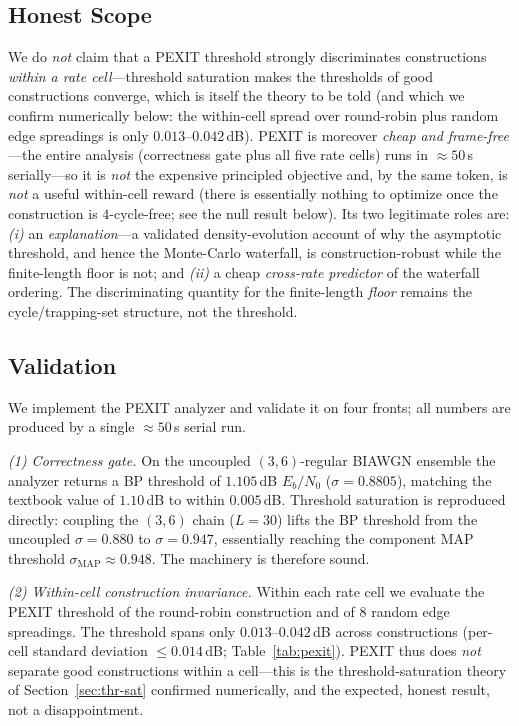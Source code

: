 \documentclass[journal]{IEEEtran}
\begin{document}
\subsection{Honest Scope}
We do \emph{not} claim that a PEXIT threshold strongly discriminates
constructions \emph{within a rate cell}---threshold saturation makes the
thresholds of good constructions converge, which is itself the theory to be
told (and which we confirm numerically below: the within-cell spread over
round-robin plus random edge spreadings is only $0.013$--$0.042$\,dB). PEXIT is
moreover \emph{cheap and frame-free}---the entire analysis (correctness gate
plus all five rate cells) runs in $\approx\!50$\,s serially---so it is
\emph{not} the expensive principled objective and, by the same token, is
\emph{not} a useful within-cell reward (there is essentially nothing to
optimize once the construction is $4$-cycle-free; see the null result below).
Its two legitimate roles are: \emph{(i)} an \emph{explanation}---a validated
density-evolution account of why the asymptotic threshold, and hence the
Monte-Carlo waterfall, is construction-robust while the finite-length floor is
not; and \emph{(ii)} a cheap \emph{cross-rate predictor} of the waterfall
ordering. The discriminating quantity for the finite-length \emph{floor}
remains the cycle/trapping-set structure, not the threshold.

\subsection{Validation}\label{sec:pexit-val}
We implement the PEXIT analyzer and validate it on four fronts; all numbers are
produced by a single $\approx\!50$\,s serial run.

\emph{(1) Correctness gate.} On the uncoupled $(3,6)$-regular BIAWGN ensemble the
analyzer returns a BP threshold of $1.105$\,dB $E_b/N_0$ ($\sigma=0.8805$),
matching the textbook value of $1.10$\,dB to within $0.005$\,dB. Threshold
saturation is reproduced directly: coupling the $(3,6)$ chain ($L{=}30$) lifts
the BP threshold from the uncoupled $\sigma=0.880$ to $\sigma=0.947$, essentially
reaching the component MAP threshold $\sigma_{\mathrm{MAP}}\approx0.948$. The
machinery is therefore sound.

\emph{(2) Within-cell construction invariance.} Within each rate cell we evaluate
the PEXIT threshold of the round-robin construction and of $8$ random edge
spreadings. The threshold spans only $0.013$--$0.042$\,dB across constructions
(per-cell standard deviation $\le0.014$\,dB; Table~\ref{tab:pexit}). PEXIT thus
does \emph{not} separate good constructions within a cell---this is the
threshold-saturation theory of Section~\ref{sec:thr-sat} confirmed numerically,
and the expected, honest result, not a disappointment.
\end{document}
